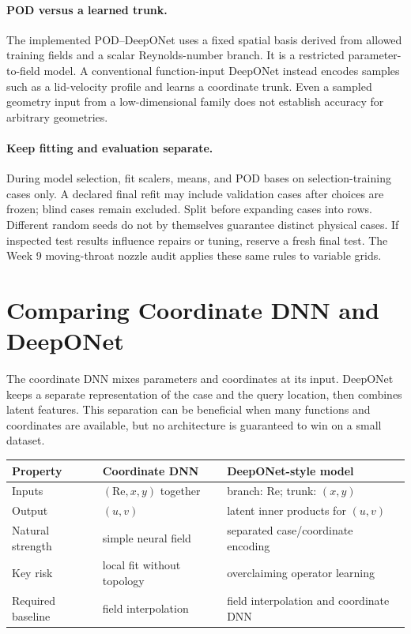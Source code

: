 \documentclass[11pt]{article}
\newcommand{\Rey}{\mathrm{Re}}
\begin{document}
\paragraph{POD versus a learned trunk.}
The implemented POD--DeepONet uses a fixed spatial basis derived from allowed
training fields and a scalar Reynolds-number branch. It is a restricted
parameter-to-field model. A conventional function-input DeepONet instead
encodes samples such as a lid-velocity profile and learns a coordinate trunk.
Even a sampled geometry input from a low-dimensional family does not establish
accuracy for arbitrary geometries.

\paragraph{Keep fitting and evaluation separate.}
During model selection, fit scalers, means, and POD bases on selection-training
cases only. A declared final refit may include validation cases after choices
are frozen; blind cases remain excluded. Split before expanding cases into rows.
Different random seeds do not by themselves guarantee distinct physical cases.
If inspected test results influence repairs or tuning, reserve a fresh final test.
The Week 9 moving-throat nozzle audit applies these same rules to variable grids.

\section{Comparing Coordinate DNN and DeepONet}
The coordinate DNN mixes parameters and coordinates at its input. DeepONet keeps a separate representation of the case and the query location, then combines latent features. This separation can be beneficial when many functions and coordinates are available, but no architecture is guaranteed to win on a small dataset.

\begin{center}
\begin{tabular}{p{}p{}p{}}
\toprule
Property & Coordinate DNN & DeepONet-style model\\
\midrule
Inputs & $(\Rey,x,y)$ together & branch: $\Rey$; trunk: $(x,y)$\\
Output & $(u,v)$ & latent inner products for $(u,v)$\\
Natural strength & simple neural field & separated case/coordinate encoding\\
Key risk & local fit without topology & overclaiming operator learning\\
Required baseline & field interpolation & field interpolation and coordinate DNN\\
\bottomrule
\end{tabular}
\end{center}
\end{document}
